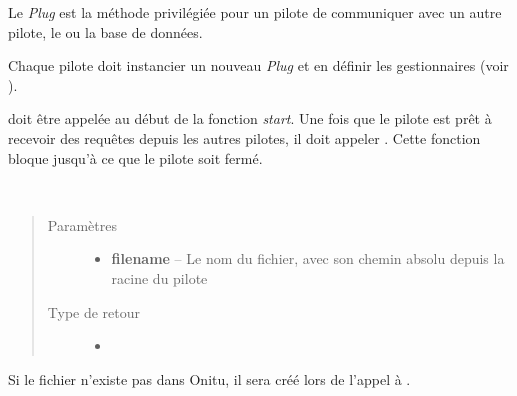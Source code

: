 \documentclass[letterpaper,10pt,english]{sphinxmanual}
\begin{document}
\begin{fulllineitems}
\label{drivers:onitu.api.Plug}
Le \emph{Plug} est la méthode privilégiée pour un pilote de communiquer avec un autre pilote, le {\hyperref[components:onitu.referee.Referee]{}} ou la base de données.

Chaque pilote doit instancier un nouveau \emph{Plug} et en définir les gestionnaires (voir {\hyperref[drivers:onitu.api.Plug.handler]{}}).

{\hyperref[drivers:onitu.api.Plug.initialize]{}} doit être appelée au début de la fonction \emph{start}. Une fois que le pilote est prêt à recevoir des requêtes depuis les autres pilotes, il doit appeler {\hyperref[components:onitu.referee.Referee.listen]{}}. Cette fonction bloque jusqu'à ce que le pilote soit fermé.

\begin{fulllineitems}
\label{drivers:onitu.api.Plug.get_metadata}~\begin{quote}\begin{description}
\item[{Paramètres}] \leavevmode\begin{itemize}
\item {} 
\textbf{filename} -- Le nom du fichier, avec son chemin absolu depuis la racine du pilote

\end{itemize}

\item[{Type de retour}] \leavevmode\begin{itemize}
\item {} 
{\hyperref[drivers:onitu.api.metadata.Metadata]{}}

\end{itemize}

\end{description}\end{quote}

Si le fichier n'existe pas dans Onitu, il sera créé lors de l'appel à {\hyperref[drivers:onitu.api.metadata.Metadata.write]{}}.

\end{fulllineitems}



\end{fulllineitems}
\end{document}
